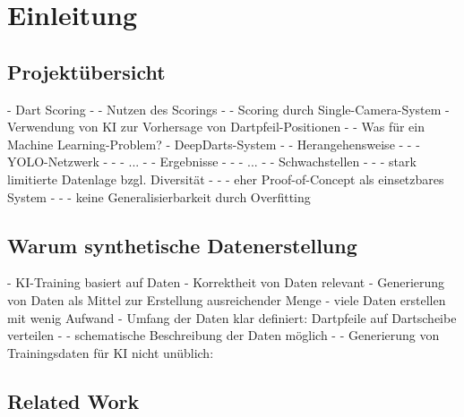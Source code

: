
\chapter{Einleitung}
\label{cha:einleitung}



\section{Projektübersicht}
\label{sec:projektuebersicht}

- Dart Scoring
- - Nutzen des Scorings
- - Scoring durch Single-Camera-System
- Verwendung von KI zur Vorhersage von Dartpfeil-Positionen
- - Was für ein Machine Learning-Problem?
- DeepDarts-System
- - Herangehensweise
- - - YOLO-Netzwerk
- - - ...
- - Ergebnisse
- - - ...
- - Schwachstellen
- - - stark limitierte Datenlage bzgl. Diversität
- - - eher Proof-of-Concept als einsetzbares System
- - - keine Generalisierbarkeit durch Overfitting



\section{Warum synthetische Datenerstellung}
\label{sec:warum_daten}

- KI-Training basiert auf Daten
- Korrektheit von Daten relevant
- Generierung von Daten als Mittel zur Erstellung ausreichender Menge
- viele Daten erstellen mit wenig Aufwand
- Umfang der Daten klar definiert: Dartpfeile auf Dartscheibe verteilen
- - schematische Beschreibung der Daten möglich
- - Generierung von Trainingsdaten für KI nicht unüblich: \cite{synth_data,synth_data_blender_defects,synth_data_cars_with_cam_aug,synth_data_importance_2,synth_data_pose_estimation,synth_data_procedural}



\section{Related Work}
\label{sec:related_work}

